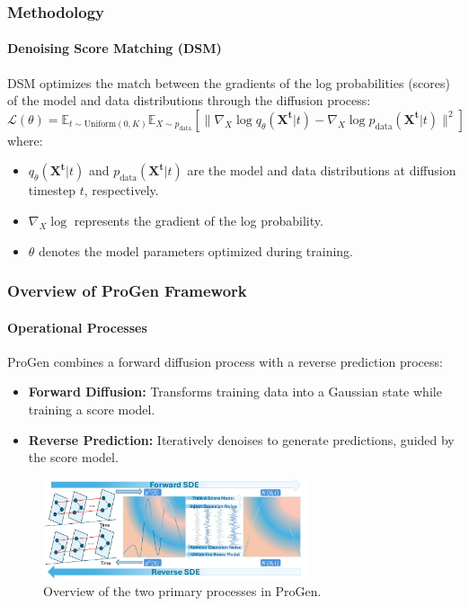 \documentclass[light]{lutbeamer} %
\begin{document}
\begin{frame}
    \frametitle{Methodology}
    \framesubtitle{Denoising Score Matching (DSM)}

    DSM optimizes the match between the gradients of the log probabilities (scores) of the model and data distributions through the diffusion process:
    \begin{equation}
        \mathcal{L}(\theta) = \mathbb{E}_{t \sim \text{Uniform}(0, K)} \mathbb{E}_{X \sim p_{\text{data}}} [\|\nabla_X \log q_{\theta}(\mathbf{X^t} | t) - \nabla_X \log p_{\text{data}}(\mathbf{X^t} | t)\|^2]
    \end{equation}
    where:
    \begin{itemize}
        \item \( q_{\theta}(\mathbf{X^t} | t) \) and \( p_{\text{data}}(\mathbf{X^t} | t) \) are the model and data distributions at diffusion timestep \(t\), respectively.
        \item \( \nabla_X \log \) represents the gradient of the log probability.
        \item \( \theta \) denotes the model parameters optimized during training.
    \end{itemize}
\end{frame}



\begin{frame}
    \frametitle{Overview of ProGen Framework}
    \framesubtitle{Operational Processes}

    ProGen combines a forward diffusion process with a reverse prediction process:
    \begin{itemize}
        \item \textbf{Forward Diffusion:} Transforms training data into a Gaussian state while training a score model.
        \item \textbf{Reverse Prediction:} Iteratively denoises to generate predictions, guided by the score model.
    \end{itemize}

    \begin{figure}[ht]
        \centering
        \includegraphics[width=0.7\textwidth]{figures/ProGen_framework_new.pdf}
        \caption{Overview of the two primary processes in ProGen.}
        \label{fig:framework}
    \end{figure}

\end{frame}
\end{document}
